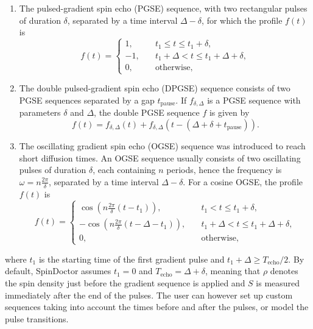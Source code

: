 \documentclass[a4paper]{article}
\begin{document}
\begin{enumerate}
    \item The pulsed-gradient spin echo (PGSE) \cite{Stejskal1965} sequence, with two rectangular pulses of duration $\delta$, separated by a time interval $\Delta - \delta$, for which the profile $f(t)$ is
          \begin{equation}\label{eq:pgse}
              f(t) =
              \begin{cases}
                  1, \quad & t_1 \leq t \leq t_1+\delta,            \\
                  -1,
                  \quad    & t_1+\Delta < t \leq t_1+\Delta+\delta, \\
                  0, \quad & \text{otherwise},
              \end{cases}
          \end{equation}
    \item The double pulsed-gradient spin echo (DPGSE) sequence consists of two PGSE sequences separated by a gap $t_\text{pause}$. If $f_{\delta, \Delta}$ is a PGSE sequence with parameters $\delta$ and $\Delta$, the double PGSE sequence $f$ is given by
          \begin{equation}\label{eq:pgse}
              f(t) = f_{\delta, \Delta}(t) + f_{\delta, \Delta}\left(t - (\Delta + \delta + t_\text{pause}) \right).
          \end{equation}
    \item The oscillating gradient spin echo (OGSE) sequence \cite{Callaghan1995,Does2003}	was introduced to reach short diffusion times. An OGSE	sequence usually consists of two oscillating pulses of duration $\delta$, each containing $n$ periods, hence the	frequency is $\omega = n\frac{2\pi}{\delta}$, separated by a time interval $\Delta-\delta$. For a cosine OGSE, the profile $f(t)$ is
          \begin{equation}\label{eq:ogse}
              f(t) =
              \begin{cases}
                  \cos\left(n \frac{2\pi}{\delta} (t - t_1)\right), \quad            & t_1 < t \leq t_1 + \delta,                   \\
                  -\cos\left(n \frac{2 \pi}{\delta} (t - \Delta - t_1)\right), \quad & t_1 + \Delta < t \leq t_1 + \Delta + \delta, \\
                  0, \quad                                                           & \text{otherwise},
              \end{cases}
          \end{equation}
\end{enumerate}
where $t_1$ is the starting time of the first gradient pulse and $t_1 + \Delta \geq T_\text{echo} / 2$. By default, SpinDoctor assumes $t_1 = 0$ and $T_\text{echo} = \Delta + \delta$, meaning that $\rho$ denotes the spin density just before the gradient sequence is applied and $S$ is measured immediately after the end of the pulses. The user can however set up custom sequences taking into account the times before and after the pulses, or model the pulse transitions.
\end{document}
